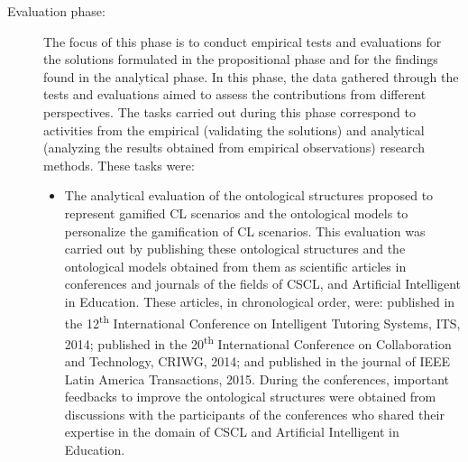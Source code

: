 \begin{description}
\item[Evaluation phase:]
The focus of this phase is to conduct empirical tests and evaluations for the solutions formulated in the propositional phase and for the findings found in the analytical phase.
In this phase, the data gathered through the tests and evaluations aimed to assess the contributions from different perspectives.
The tasks carried out during this phase correspond to activities from the empirical (validating the solutions) and analytical (analyzing the results obtained from empirical observations) research methods.
These tasks were:

\begin{itemize}
\item
The analytical evaluation of the ontological structures proposed to represent gamified CL scenarios and the ontological models to personalize the gamification of CL scenarios.
This evaluation was carried out by publishing these ontological structures and the ontological models obtained from them as scientific articles in conferences and journals of the fields of CSCL, and Artificial Intelligent in Education. 
These articles, in chronological order, were:
 published in the 12\textsuperscript{th} International Conference on Intelligent Tutoring Systems, ITS, 2014;
 published in the 20\textsuperscript{th} International Conference on Collaboration and Technology, CRIWG, 2014; and
 published in the journal of IEEE Latin America Transactions, 2015.
During the conferences, important feedbacks to improve the ontological structures were obtained from discussions with the participants of the conferences who shared their expertise in the domain of CSCL and Artificial Intelligent in Education.


\end{itemize}
\end{description}
